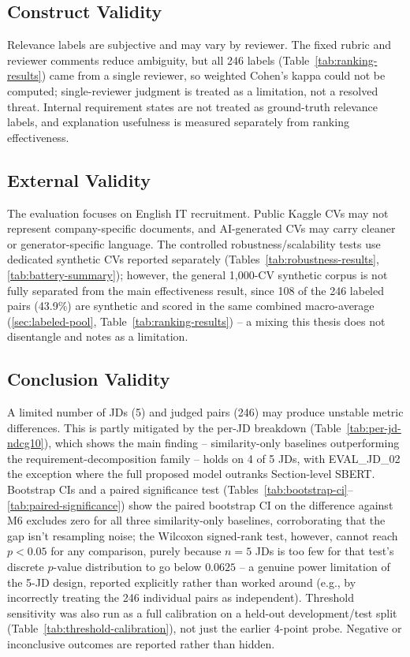 \documentclass[12pt,a4paper,oneside]{report}
\begin{document}
\subsection{Construct Validity}
Relevance labels are subjective and may vary by reviewer. The fixed rubric and reviewer comments reduce ambiguity, but all 246 labels (Table~\ref{tab:ranking-results}) came from a single reviewer, so weighted Cohen's kappa \citep{cohen1968} could not be computed; single-reviewer judgment is treated as a limitation, not a resolved threat. Internal requirement states are not treated as ground-truth relevance labels, and explanation usefulness is measured separately from ranking effectiveness.

\subsection{External Validity}
The evaluation focuses on English IT recruitment. Public Kaggle CVs may not represent company-specific documents, and AI-generated CVs may carry cleaner or generator-specific language. The controlled robustness/scalability tests use dedicated synthetic CVs reported separately (Tables~\ref{tab:robustness-results}, \ref{tab:battery-summary}); however, the general 1,000-CV synthetic corpus is not fully separated from the main effectiveness result, since 108 of the 246 labeled pairs (43.9\%) are synthetic and scored in the same combined macro-average (\cref{sec:labeled-pool}, Table~\ref{tab:ranking-results}) -- a mixing this thesis does not disentangle and notes as a limitation.

\subsection{Conclusion Validity}
A limited number of JDs (5) and judged pairs (246) may produce unstable metric differences. This is partly mitigated by the per-JD breakdown (Table~\ref{tab:per-jd-ndcg10}), which shows the main finding -- similarity-only baselines outperforming the requirement-decomposition family -- holds on 4 of 5 JDs, with EVAL\_JD\_02 the exception where the full proposed model outranks Section-level SBERT. Bootstrap CIs and a paired significance test (Tables~\ref{tab:bootstrap-ci}--\ref{tab:paired-significance}) show the paired bootstrap CI on the difference against M6 excludes zero for all three similarity-only baselines, corroborating that the gap isn't resampling noise; the Wilcoxon signed-rank test, however, cannot reach $p<0.05$ for any comparison, purely because $n=5$ JDs is too few for that test's discrete $p$-value distribution to go below $0.0625$ -- a genuine power limitation of the 5-JD design, reported explicitly rather than worked around (e.g., by incorrectly treating the 246 individual pairs as independent). Threshold sensitivity was also run as a full calibration on a held-out development/test split (Table~\ref{tab:threshold-calibration}), not just the earlier 4-point probe. Negative or inconclusive outcomes are reported rather than hidden.
\end{document}
